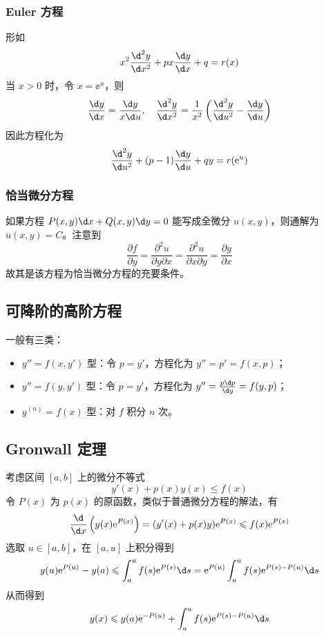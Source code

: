 \subsubsection*{Euler 方程}
形如
\[ x^2 \frac{\d^2 y}{\d x^2} + p x \frac{\d y}{\d x} + q = r(x) \]
当 $x > 0$ 时，令 $x = \ee^u$，则
\[ \frac{\d y}{\d x} = \frac{\d y}{x \d u}, \quad \frac{\d^2 y}{\d x^2} = \frac{1}{x^2} \left( \frac{\d^2 y}{\d u^2} - \frac{\d y}{\d u} \right) \]
因此方程化为
\[ \frac{\d^2 y}{\d u^2} + (p-1) \frac{\d y}{\d u} + qy = r(\ee^u) \]


\subsubsection*{恰当微分方程}

如果方程 $P(x, y) \d x + Q(x, y) \d y = 0$ 能写成全微分 $u(x, y)$，则通解为 $u(x, y) = C$。注意到
\[ \frac{\partial f}{\partial y} = \frac{\partial^2 u}{\partial y \partial x} = \frac{\partial^2 u}{\partial x \partial y} = \frac{\partial g}{\partial x} \]
故其是该方程为恰当微分方程的充要条件。

\subsection{可降阶的高阶方程}

一般有三类：

\begin{itemize}
	\item $y'' = f(x, y')$ 型：令 $p = y'$，方程化为 $y'' = p' = f(x, p)$；
	\item $y'' = f(y, y')$ 型：令 $p = y'$，方程化为 $y'' = \frac{p \d p}{\d y} = f(y, p)$；
	\item $y^{(n)} = f(x)$ 型：对 $f$ 积分 $n$ 次。
\end{itemize}

\subsection{Gronwall 定理}

考虑区间 $[a, b]$ 上的微分不等式
\[ y'(x) + p(x) y(x) \leqslant f(x) \]
令 $P(x)$ 为 $p(x)$ 的原函数，类似于普通微分方程的解法，有
\[ \frac{\d }{\d x} \left(y(x) \ee^{P(x)}\right) = (y'(x) + p(x) y) \ee^{P(x)} \leqslant f(x) \ee^{P(x)} \]
选取 $u \in [a, b]$，在 $[a, u]$ 上积分得到
\[ y(u) \ee^{P(u)} - y(a) \leqslant \int_{a}^{u} f(s) \ee^{P(s)} \d s = \ee^{P(u)} \int_{a}^{u} f(s) \ee^{P(s) - P(u)} \d s  \]
从而得到
\[ y(x) \leqslant y(a) \ee^{-P(u)} + \int_{a}^{u} f(s) \ee^{P(s) - P(u)} \d s \]

